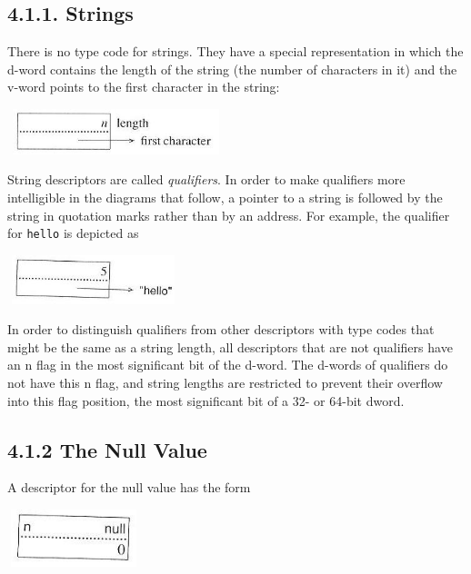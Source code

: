 \subsection[4.1.1. Strings]{4.1.1. Strings}

There is no type code for strings. They have a special representation
in which the d-word contains the length of the string (the number of
characters in it) and the v-word points to the first character in the
string:



\begin{center}
\includegraphics[width=2.4898in,height=0.5193in]{ib-img/ib-img006.jpg}
\end{center}

String descriptors are called \textit{qualifiers}. In order to make
qualifiers more intelligible in the diagrams that follow, a pointer to
a string is followed by the string in quotation marks rather than by
an address. For example, the qualifier for
\texttt{{\textquotedbl}hello{\textquotedbl}} is depicted as

\begin{center}
\includegraphics[width=1.9693in,height=0.5598in]{ib-img/ib-img007.jpg}
\end{center}

In order to distinguish qualifiers from other descriptors with type
codes that might be the same as a string length, all descriptors that
are not qualifiers have an n flag in the most significant bit of the
d-word. The d-words of qualifiers do not have this n flag, and string
lengths are restricted to prevent their overflow into this flag
position, the most significant bit of a 32- or 64-bit dword.

\subsection[4.1.2 The Null Value]{4.1.2 The Null Value}

A descriptor for the null value has the form

\begin{center}
\includegraphics[width=1.5193in,height=0.6598in]{ib-img/ib-img008.jpg}
\end{center}

